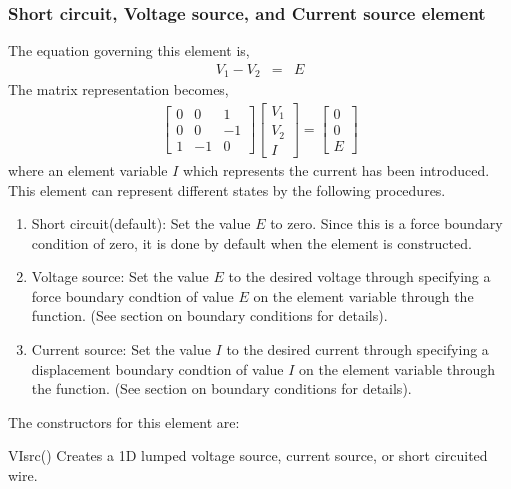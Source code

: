 \subsubsection*{Short circuit, Voltage source, and Current source element}
The equation governing this element is,
\begin{eqnarray}
V_1-V_2 &=& E
\end{eqnarray}
The matrix representation becomes,
\begin{eqnarray}
\left[
\begin{array}{rrr}
0 & 0 &  1 \\
0 & 0 & -1 \\
1 &-1 &  0
\end{array}
\right]
\left[
\begin{array}{r}
V_1 \\
V_2 \\
I
\end{array}
\right]
=
\left[
\begin{array}{r}
0 \\
0 \\
E
\end{array}
\right]
\end{eqnarray}
where an element variable $I$ which represents the current has
been introduced. This element can represent different states
by the following procedures.
\begin{enumerate}

\item Short circuit(default): Set the value $E$ to zero. Since this is a
      force boundary condition of zero, it is done by default when
      the element is constructed.

\item Voltage source: Set the value $E$ to the desired voltage
      through specifying a force boundary condtion of value $E$ on 
      the element variable through the 
      function. (See section on boundary conditions for details).

\item Current source: Set the value $I$ to the desired current
      through specifying a displacement boundary condtion of value $I$ on 
      the element variable through the 
      function. (See section on boundary conditions for details).

\end{enumerate}
The constructors for this element are:
\begin{codelist}
  \item[VIsrc()]
  Creates a 1D lumped voltage source, current source, or short circuited
  wire.

\end{codelist}

